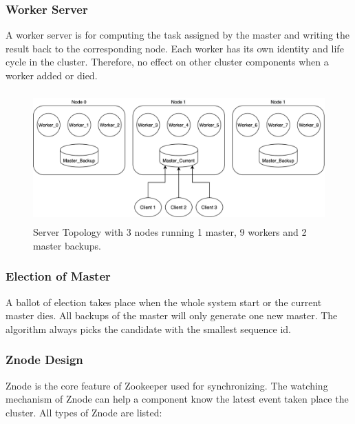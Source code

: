 \documentclass[runningheads,a4paper]{llncs}
\begin{document}
\subsubsection{Worker Server}

A worker server is for computing the task assigned by the master and writing the result back to the corresponding node. Each worker has its own identity and life cycle in the cluster. Therefore, no effect on other cluster components when a worker added or died.


\begin{figure}[htbp]
\begin{center}
\includegraphics[height=5cm]{./ServerTopo.png}
\caption{Server Topology with 3 nodes running 1 master, 9 workers and 2 master backups.}
\label{Server Topology}
\end{center}
\end{figure}


\subsubsection{Election of Master}
A ballot of election takes place when the whole system start or the current master dies. All backups of the master will only generate one new master. The algorithm always picks the candidate with the smallest sequence id.



\subsubsection{Znode Design}
Znode is the core feature of Zookeeper used for synchronizing. The watching mechanism of Znode can help a component know the latest event taken place the cluster. All types of Znode are listed:
\end{document}
